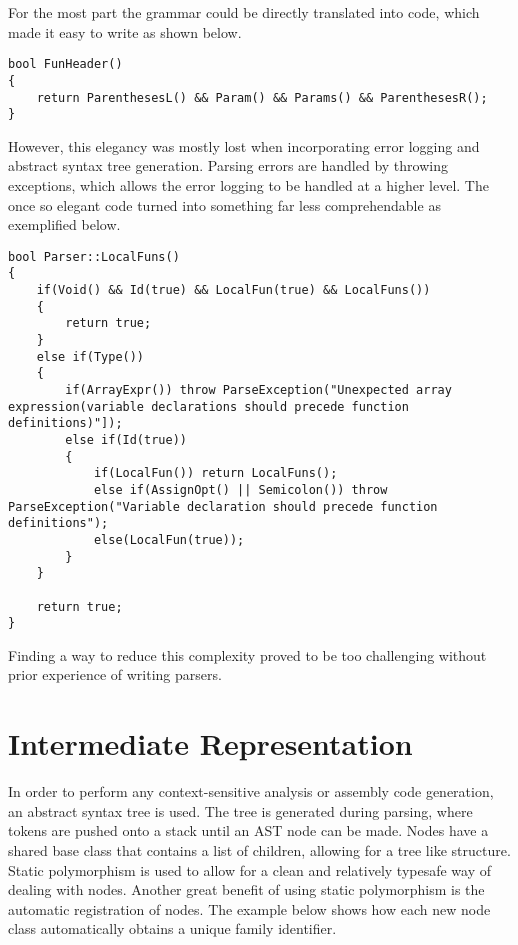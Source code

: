 \documentclass[12pt]{article}
\begin{document}
For the most part the grammar could be directly translated into code, which made it easy to write as shown below.
\begin{lstlisting}
bool FunHeader()
{
	return ParenthesesL() && Param() && Params() && ParenthesesR();
}
\end{lstlisting}
However, this elegancy was mostly lost when incorporating error logging and abstract syntax tree generation. Parsing errors are handled by throwing exceptions, which allows the error logging to be handled at a higher level. The once so elegant code turned into something far less comprehendable as exemplified below.
\begin{lstlisting}
bool Parser::LocalFuns()
{
	if(Void() && Id(true) && LocalFun(true) && LocalFuns())
	{
		return true;
	}
	else if(Type())
	{
		if(ArrayExpr()) throw ParseException("Unexpected array expression(variable declarations should precede function definitions)"]);
		else if(Id(true))
		{
			if(LocalFun()) return LocalFuns();
			else if(AssignOpt() || Semicolon()) throw ParseException("Variable declaration should precede function definitions");
			else(LocalFun(true));
		}
	}

	return true;
}
\end{lstlisting}

Finding a way to reduce this complexity proved to be too challenging without prior experience of writing parsers.

\section{Intermediate Representation}

In order to perform any context-sensitive analysis or assembly code generation, an abstract syntax tree is used. The tree is generated during parsing, where tokens are pushed onto a stack until an AST node can be made. Nodes have a shared base class that contains a list of children, allowing for a tree like structure. Static polymorphism is used to allow for a clean and relatively typesafe way of dealing with nodes. Another great benefit of using static polymorphism is the automatic registration of nodes. The example below shows how each new node class automatically obtains a unique family identifier.
\end{document}
